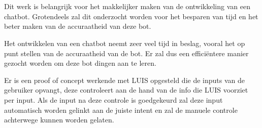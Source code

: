 
%
%

%



\chapter*{}

Dit werk is belangrijk voor het makkelijker maken van de ontwikkeling van een chatbot. Grotendeels zal dit onderzocht worden voor het besparen van tijd en het beter maken van de accuraatheid van deze bot.

Het ontwikkelen van een chatbot neemt zeer veel tijd in beslag, vooral het op punt stellen van de accuraatheid van de bot. Er zal dus een efficiëntere manier gezocht worden om deze bot dingen aan te leren.

Er is een proof of concept werkende met LUIS opgesteld die de inputs van de gebruiker opvangt, deze controleert aan de hand van de info die LUIS voorziet per input. Als de input na deze controle is goedgekeurd zal deze input automatisch worden gelinkt aan de juiste intent en zal de manuele controle achterwege kunnen worden gelaten.


